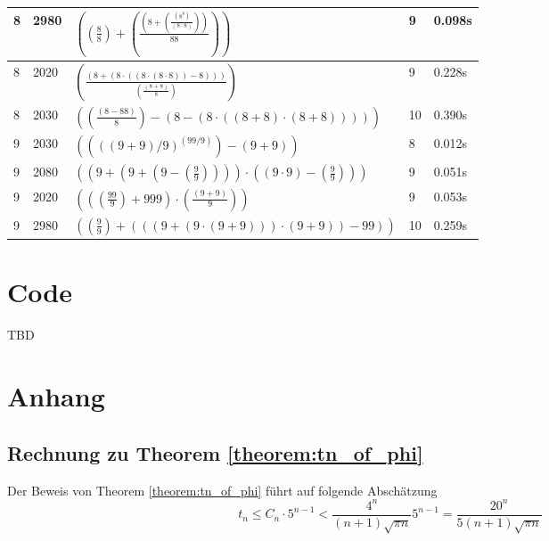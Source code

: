 \documentclass{article}
\theoremstyle{nonumberplain}
\begin{document}
\begin{center}
\begin{longtable}{ | l | l | p{9.5cm} | l | l | }
        8 & 2980 & \( \left(\left(\frac{8}{8}\right) + \left(\frac{\left(8 + \left(\frac{\left({8}^{8}\right)}{\left(8 \cdot 8\right)}\right)\right)}{88}\right)\right) \) & 9 & 0.098s \\\hline
        8 & 2020 & \( \left(\frac{\left(8 + \left(8 \cdot \left(\left(8 \cdot \left(8 \cdot 8\right)\right) - 8\right)\right)\right)}{\left(\frac{\left(8 + 8\right)}{8}\right)}\right) \) & 9 & 0.228s \\\hline
        8 & 2030 & \( \left(\left(\frac{\left(8 - 88\right)}{8}\right) - \left(8 - \left(8 \cdot \left(\left(8 + 8\right) \cdot \left(8 + 8\right)\right)\right)\right)\right) \) & 10 & 0.390s \\\hline
        9 & 2030 & \( \left(\left({((9 + 9) / 9)}^{(99 / 9)}\right) - \left(9 + 9\right)\right) \) & 8 & 0.012s \\\hline
        9 & 2080 & \( \left(\left(9 + \left(9 + \left(9 - \left(\frac{9}{9}\right)\right)\right)\right) \cdot \left(\left(9 \cdot 9\right) - \left(\frac{9}{9}\right)\right)\right) \) & 9 & 0.051s \\\hline
        9 & 2020 & \( \left(\left(\left(\frac{99}{9}\right) + 999\right) \cdot \left(\frac{\left(9 + 9\right)}{9}\right)\right) \) & 9 & 0.053s \\\hline
        9 & 2980 & \( \left(\left(\frac{9}{9}\right) + \left(\left(\left(9 + \left(9 \cdot \left(9 + 9\right)\right)\right) \cdot \left(9 + 9\right)\right) - 99\right)\right) \) & 10 & 0.259s \\\hline
\end{longtable}
\end{center}

\section{Code}

TBD

\section{Anhang}

\subsection{Rechnung zu Theorem \ref{theorem:tn_of_phi}}

Der Beweis von Theorem \ref{theorem:tn_of_phi} führt auf folgende Abschätzung
    \[t_n \leq C_n \cdot 5^{n-1} < \frac{4^n}{(n+1)\sqrt{\pi n}} 5^{n-1} =  \frac{20^n}{5(n+1)\sqrt{\pi n}}\]
\end{document}
